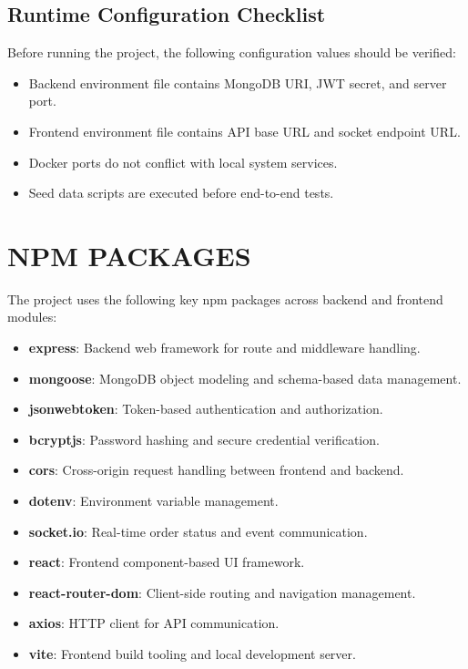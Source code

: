 \documentclass[12pt,a4paper]{report}
\begin{document}
\section{Runtime Configuration Checklist}
Before running the project, the following configuration values should be verified:
\begin{itemize}
    \item Backend environment file contains MongoDB URI, JWT secret, and server port.
    \item Frontend environment file contains API base URL and socket endpoint URL.
    \item Docker ports do not conflict with local system services.
    \item Seed data scripts are executed before end-to-end tests.
\end{itemize}

\chapter{NPM PACKAGES}
The project uses the following key npm packages across backend and frontend modules:

\begin{itemize}
    \item \textbf{express}: Backend web framework for route and middleware handling.
    \item \textbf{mongoose}: MongoDB object modeling and schema-based data management.
    \item \textbf{jsonwebtoken}: Token-based authentication and authorization.
    \item \textbf{bcryptjs}: Password hashing and secure credential verification.
    \item \textbf{cors}: Cross-origin request handling between frontend and backend.
    \item \textbf{dotenv}: Environment variable management.
    \item \textbf{socket.io}: Real-time order status and event communication.
    \item \textbf{react}: Frontend component-based UI framework.
    \item \textbf{react-router-dom}: Client-side routing and navigation management.
    \item \textbf{axios}: HTTP client for API communication.
    \item \textbf{vite}: Frontend build tooling and local development server.
\end{itemize}
\end{document}
